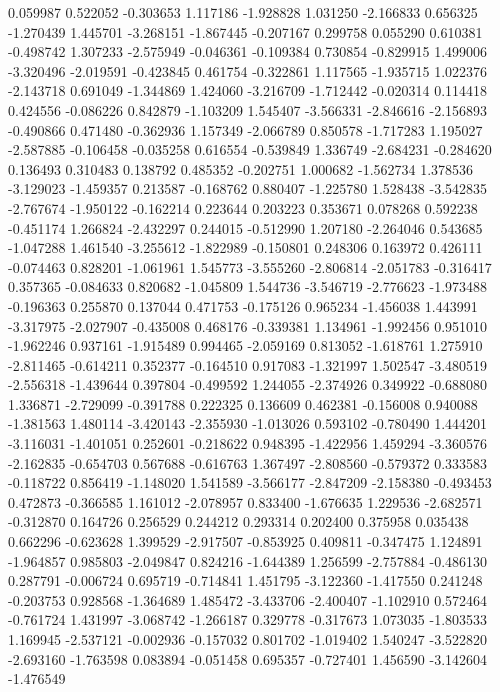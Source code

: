 0.059987
0.522052
-0.303653
1.117186
-1.928828
1.031250
-2.166833
0.656325
-1.270439
1.445701
-3.268151
-1.867445
-0.207167
0.299758
0.055290
0.610381
-0.498742
1.307233
-2.575949
-0.046361
-0.109384
0.730854
-0.829915
1.499006
-3.320496
-2.019591
-0.423845
0.461754
-0.322861
1.117565
-1.935715
1.022376
-2.143718
0.691049
-1.344869
1.424060
-3.216709
-1.712442
-0.020314
0.114418
0.424556
-0.086226
0.842879
-1.103209
1.545407
-3.566331
-2.846616
-2.156893
-0.490866
0.471480
-0.362936
1.157349
-2.066789
0.850578
-1.717283
1.195027
-2.587885
-0.106458
-0.035258
0.616554
-0.539849
1.336749
-2.684231
-0.284620
0.136493
0.310483
0.138792
0.485352
-0.202751
1.000682
-1.562734
1.378536
-3.129023
-1.459357
0.213587
-0.168762
0.880407
-1.225780
1.528438
-3.542835
-2.767674
-1.950122
-0.162214
0.223644
0.203223
0.353671
0.078268
0.592238
-0.451174
1.266824
-2.432297
0.244015
-0.512990
1.207180
-2.264046
0.543685
-1.047288
1.461540
-3.255612
-1.822989
-0.150801
0.248306
0.163972
0.426111
-0.074463
0.828201
-1.061961
1.545773
-3.555260
-2.806814
-2.051783
-0.316417
0.357365
-0.084633
0.820682
-1.045809
1.544736
-3.546719
-2.776623
-1.973488
-0.196363
0.255870
0.137044
0.471753
-0.175126
0.965234
-1.456038
1.443991
-3.317975
-2.027907
-0.435008
0.468176
-0.339381
1.134961
-1.992456
0.951010
-1.962246
0.937161
-1.915489
0.994465
-2.059169
0.813052
-1.618761
1.275910
-2.811465
-0.614211
0.352377
-0.164510
0.917083
-1.321997
1.502547
-3.480519
-2.556318
-1.439644
0.397804
-0.499592
1.244055
-2.374926
0.349922
-0.688080
1.336871
-2.729099
-0.391788
0.222325
0.136609
0.462381
-0.156008
0.940088
-1.381563
1.480114
-3.420143
-2.355930
-1.013026
0.593102
-0.780490
1.444201
-3.116031
-1.401051
0.252601
-0.218622
0.948395
-1.422956
1.459294
-3.360576
-2.162835
-0.654703
0.567688
-0.616763
1.367497
-2.808560
-0.579372
0.333583
-0.118722
0.856419
-1.148020
1.541589
-3.566177
-2.847209
-2.158380
-0.493453
0.472873
-0.366585
1.161012
-2.078957
0.833400
-1.676635
1.229536
-2.682571
-0.312870
0.164726
0.256529
0.244212
0.293314
0.202400
0.375958
0.035438
0.662296
-0.623628
1.399529
-2.917507
-0.853925
0.409811
-0.347475
1.124891
-1.964857
0.985803
-2.049847
0.824216
-1.644389
1.256599
-2.757884
-0.486130
0.287791
-0.006724
0.695719
-0.714841
1.451795
-3.122360
-1.417550
0.241248
-0.203753
0.928568
-1.364689
1.485472
-3.433706
-2.400407
-1.102910
0.572464
-0.761724
1.431997
-3.068742
-1.266187
0.329778
-0.317673
1.073035
-1.803533
1.169945
-2.537121
-0.002936
-0.157032
0.801702
-1.019402
1.540247
-3.522820
-2.693160
-1.763598
0.083894
-0.051458
0.695357
-0.727401
1.456590
-3.142604
-1.476549
